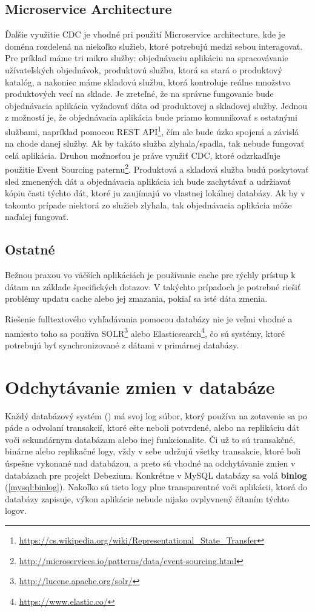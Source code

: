 \subsection{Microservice Architecture}
Ďalšie využitie CDC je vhodné pri použití Microservice architecture, kde je doména rozdelená na niekoľko služieb, ktoré potrebujú medzi sebou interagovať. Pre príklad máme tri mikro služby: objednávaciu aplikáciu na spracovávanie užívateľských objednávok, produktovú službu, ktorá sa stará o produktový katalóg, a nakoniec máme skladovú službu, ktorá kontroluje reálne množstvo produktových vecí na sklade. Je zreteľné, že na správne fungovanie bude objednávacia aplikácia vyžadovať dáta od produktovej a skladovej služby. Jednou z možností je, že objednávacia aplikácia bude priamo komunikovať s ostatnými službami, napríklad pomocou REST API\footnote{\url{https://cs.wikipedia.org/wiki/Representational_State_Transfer}}, čím ale bude úzko spojená a závislá na chode danej služby. Ak by takáto služba zlyhala/spadla, tak nebude fungovať celá aplikácia. Druhou možnosťou je práve využiť CDC, ktoré odzrkadľuje použitie Event Sourcing paternu\footnote{\url{http://microservices.io/patterns/data/event-sourcing.html}}. Produktová a skladová služba budú poskytovať sled zmenených dát a objednávacia aplikácia ich bude zachytávať a udržiavať kópiu časti týchto dát, ktoré ju zaujímajú vo vlastnej lokálnej databázy. Ak by v takomto prípade niektorá zo služieb zlyhala, tak objednávacia aplikácia môže naďalej fungovať.

\subsection{Ostatné}
Bežnou praxou vo väčších aplikáciách je používanie cache pre rýchly prístup k dátam na základe špecifických dotazov. V takýchto prípadoch je potrebné riešiť problémy updatu cache alebo jej zmazania, pokiaľ sa isté dáta zmenia.

Riešenie fulltextového vyhľadávania pomocou databázy nie je veľmi vhodné a namiesto toho sa používa SOLR\footnote{\url{http://lucene.apache.org/solr/}} alebo Elasticsearch\footnote{\url{https://www.elastic.co/}}, čo sú systémy, ktoré potrebujú byť synchronizované z dátami v primárnej databázy. 


\section{Odchytávanie zmien v databáze}
Každý databázový systém () má svoj log súbor, ktorý používa na zotavenie sa po páde a odvolaní transakcií, ktoré ešte neboli potvrdené, alebo na replikáciu dát voči sekundárnym databázam alebo inej funkcionalite. Či už to sú transakčné, binárne alebo replikačné logy, vždy v sebe udržujú všetky transakcie, ktoré boli úspešne vykonané nad databázou, a preto sú vhodné na odchytávanie zmien v databázach pre projekt Debezium. Konkrétne v MySQL databázy sa volá \textbf{binlog} (\ref{mysql:binlog}). Nakoľko sú tieto logy plne transparentné voči aplikácii, ktorá do databázy zapisuje, výkon aplikácie nebude nijako ovplyvnený čítaním týchto logov.

